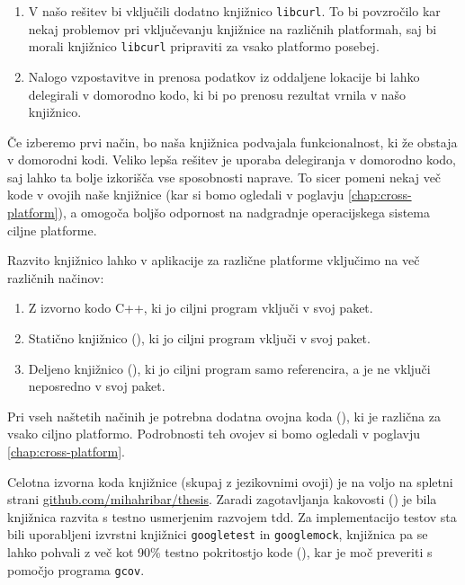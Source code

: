 \begin{enumerate}
  \item V našo rešitev bi vključili dodatno knjižnico \texttt{libcurl}. To bi povzročilo kar nekaj problemov pri vključevanju knjižnice na različnih platformah, saj bi morali knjižnico \texttt{libcurl} pripraviti za vsako platformo posebej.
  \item Nalogo vzpostavitve in prenosa podatkov iz oddaljene lokacije bi lahko delegirali v domorodno kodo, ki bi po prenosu rezultat vrnila v našo knjižnico.
\end{enumerate}

Če izberemo prvi način, bo naša knjižnica podvajala funkcionalnost, ki že obstaja v domorodni kodi. Veliko lepša rešitev je uporaba delegiranja v domorodno kodo, saj lahko ta bolje izkorišča vse sposobnosti naprave. To sicer pomeni nekaj več kode v ovojih naše knjižnice (kar si bomo ogledali v poglavju \ref{chap:cross-platform}), a omogoča boljšo odpornost na nadgradnje operacijskega sistema ciljne platforme.

Razvito knjižnico lahko v aplikacije za različne platforme vključimo na več različnih načinov:

\begin{enumerate}
  \item Z izvorno kodo C++, ki jo ciljni program vključi v svoj paket.
  \item Statično knjižnico (), ki jo ciljni program vključi v svoj paket.
  \item Deljeno knjižnico (), ki jo ciljni program samo referencira, a je ne vključi neposredno v svoj paket.
\end{enumerate}

Pri vseh naštetih načinih je potrebna dodatna ovojna koda (), ki je različna za vsako ciljno platformo. Podrobnosti teh ovojev si bomo ogledali v poglavju \ref{chap:cross-platform}.

Celotna izvorna koda knjižnice (skupaj z jezikovnimi ovoji) je na voljo na spletni strani \href{https://github.com/mihahribar/thesis}{github.com/mihahribar/thesis}. Zaradi zagotavljanja kakovosti () je bila knjižnica razvita s testno usmerjenim razvojem \gls{tdd}\cite{tdd-cpp}. Za implementacijo testov sta bili uporabljeni izvrstni knjižnici \texttt{googletest}\cite{googletest} in \texttt{googlemock}\cite{googlemock}, knjižnica pa se lahko pohvali z več kot 90\% testno pokritostjo kode (), kar je moč preveriti s pomočjo programa \texttt{gcov}.

